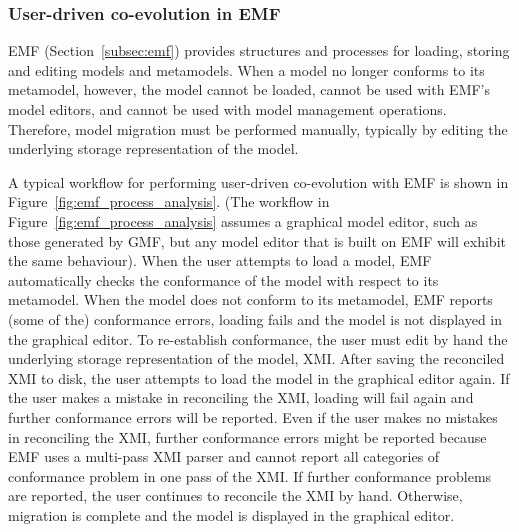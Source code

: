 \subsubsection{User-driven co-evolution in EMF}
EMF (Section~\ref{subsec:emf}) provides structures and processes for loading, storing and editing models and metamodels. When a model no longer conforms to its metamodel, however, the model cannot be loaded, cannot be used with EMF's model editors, and cannot be used with model management operations. Therefore, model migration must be performed manually, typically by editing the underlying storage representation of the model.

A typical workflow for performing user-driven co-evolution with EMF is shown in Figure~\ref{fig:emf_process_analysis}. (The workflow in Figure~\ref{fig:emf_process_analysis} assumes a graphical model editor, such as those generated by GMF, but any model editor that is built on  EMF will exhibit the same behaviour). When the user attempts to load a model, EMF automatically checks the conformance of the model with respect to its metamodel. When the model does not conform to its metamodel, EMF reports (some of the) conformance errors, loading fails and the model is not displayed in the graphical editor. To re-establish conformance, the user must edit by hand the underlying storage representation of the model, XMI. After saving the reconciled XMI to disk, the user attempts to load the model in the graphical editor again. If the user makes a mistake in reconciling the XMI, loading will fail again and further conformance errors will be reported. Even if the user makes no mistakes in reconciling the XMI, further conformance errors might be reported because EMF uses a multi-pass XMI parser and cannot report all categories of conformance problem in one pass of the XMI. If further conformance problems are reported, the user continues to reconcile the XMI by hand. Otherwise, migration is complete and the model is displayed in the graphical editor. 

